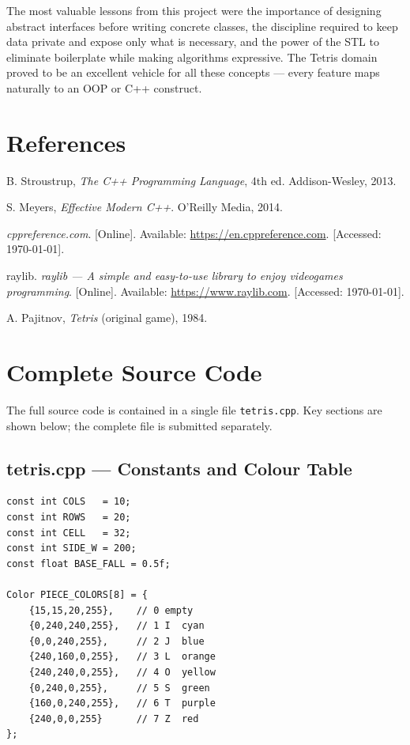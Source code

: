 \documentclass[11pt]{article}
\begin{document}
The most valuable lessons from this project were the importance of designing abstract
interfaces before writing concrete classes, the discipline required to keep data private
and expose only what is necessary, and the power of the STL to eliminate boilerplate
while making algorithms expressive.
The Tetris domain proved to be an excellent vehicle for all these concepts --- every
feature maps naturally to an OOP or C++ construct.

\newpage
\section*{References}

\begin{enumerate}[label={[\arabic*]}]
    \item B. Stroustrup, \textit{The C++ Programming Language}, 4th ed. Addison-Wesley, 2013.
    \item S. Meyers, \textit{Effective Modern C++}. O'Reilly Media, 2014.
    \item \textit{cppreference.com}. [Online]. Available: \url{https://en.cppreference.com}. [Accessed: \today].
    \item raylib. \textit{raylib --- A simple and easy-to-use library to enjoy videogames programming}. [Online]. Available: \url{https://www.raylib.com}. [Accessed: \today].
    \item A. Pajitnov, \textit{Tetris} (original game), 1984.
\end{enumerate}

\newpage
\appendix
\section{Complete Source Code}
\label{sec:code}

The full source code is contained in a single file \texttt{tetris.cpp}.
Key sections are shown below; the complete file is submitted separately.

\subsection{tetris.cpp --- Constants and Colour Table}
\begin{lstlisting}[caption={Global constants and piece colours}]
const int COLS   = 10;
const int ROWS   = 20;
const int CELL   = 32;
const int SIDE_W = 200;
const float BASE_FALL = 0.5f;

Color PIECE_COLORS[8] = {
    {15,15,20,255},    // 0 empty
    {0,240,240,255},   // 1 I  cyan
    {0,0,240,255},     // 2 J  blue
    {240,160,0,255},   // 3 L  orange
    {240,240,0,255},   // 4 O  yellow
    {0,240,0,255},     // 5 S  green
    {160,0,240,255},   // 6 T  purple
    {240,0,0,255}      // 7 Z  red
};
\end{lstlisting}
\end{document}
